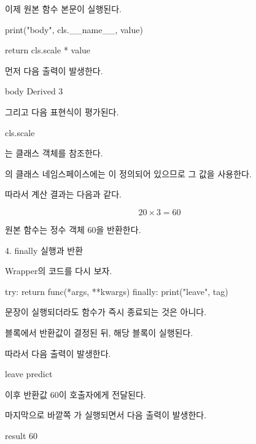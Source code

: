 이제 원본 함수 본문이 실행된다.

\begin{dhkcode}
print("body", cls.__name__, value)

return cls.scale * value
\end{dhkcode}

먼저 다음 출력이 발생한다.

\begin{dhkzsh}
body Derived 3
\end{dhkzsh}

그리고 다음 표현식이 평가된다.

\begin{dhkcode}
cls.scale
\end{dhkcode}

는  클래스 객체를 참조한다.

의 클래스 네임스페이스에는 이 정의되어 있으므로 그 값을 사용한다.

따라서 계산 결과는 다음과 같다.

\[
20 \times 3 = 60
\]

원본 함수는 정수 객체 60을 반환한다.

\begin{dhknote}
\begin{dhksmry}[centered]
4. finally 실행과 반환
\end{dhksmry}
\end{dhknote}

Wrapper의 코드를 다시 보자.

\begin{dhkcode}
try:
    return func(*args, **kwargs)
finally:
    print("leave", tag)
\end{dhkcode}

 문장이 실행되더라도 함수가 즉시 종료되는 것은 아니다.

블록에서 반환값이 결정된 뒤, 해당  블록이 실행된다.

따라서 다음 출력이 발생한다.

\begin{dhkzsh}
leave predict
\end{dhkzsh}

이후 반환값 60이 호출자에게 전달된다.

마지막으로 바깥쪽 가 실행되면서 다음 출력이 발생한다.

\begin{dhkzsh}
result 60
\end{dhkzsh}

